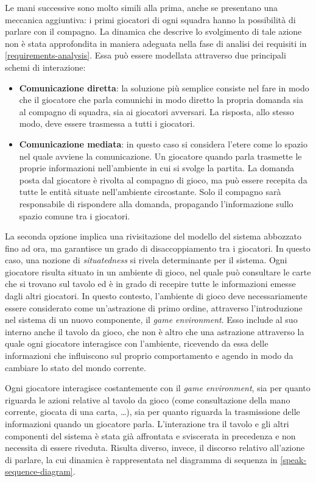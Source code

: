 \documentclass[a4paper,12pt]{article}
\begin{document}
Le mani successive sono molto simili alla prima, anche se presentano una meccanica aggiuntiva: i primi giocatori di ogni squadra hanno la possibilità di parlare con il compagno. La dinamica che descrive lo svolgimento di tale azione non è stata approfondita in maniera adeguata nella fase di analisi dei requisiti in \autoref{requirements-analysis}. Essa può essere modellata attraverso due principali schemi di interazione:
\begin{itemize}
	\item \textbf{Comunicazione diretta}: la soluzione più semplice consiste nel fare in modo che il giocatore che parla comunichi in modo diretto la propria domanda sia al compagno di squadra, sia ai giocatori avversari. La risposta, allo stesso modo, deve essere trasmessa a tutti i giocatori.
	\item \textbf{Comunicazione mediata}: in questo caso si considera l'etere come lo spazio nel quale avviene la comunicazione. Un giocatore quando parla trasmette le proprie informazioni nell'ambiente in cui si svolge la partita. La domanda posta dal giocatore è rivolta al compagno di gioco, ma può essere recepita da tutte le entità situate nell'ambiente circostante. Solo il compagno sarà responsabile di rispondere alla domanda, propagando l'informazione sullo spazio comune tra i giocatori.
\end{itemize}
La seconda opzione implica una rivisitazione del modello del sistema abbozzato fino ad ora, ma garantisce un grado di disaccoppiamento tra i giocatori. In questo caso, una nozione di \emph{situatedness} si rivela determinante per il sistema. Ogni giocatore risulta situato in un ambiente di gioco, nel quale può consultare le carte che si trovano sul tavolo ed è in grado di recepire tutte le informazioni emesse dagli altri giocatori. In questo contesto, l'ambiente di gioco deve necessariamente essere considerato come un'astrazione di primo ordine, attraverso l'introduzione nel sistema di un nuovo componente, il \emph{game environment}. Esso include al suo interno anche il tavolo da gioco, che non è altro che una astrazione attraverso la quale ogni giocatore interagisce con l'ambiente, ricevendo da essa delle informazioni che influiscono sul proprio comportamento e agendo in modo da cambiare lo stato del mondo corrente. 

Ogni giocatore interagisce costantemente con il \emph{game environment}, sia per quanto riguarda le azioni relative al tavolo da gioco (come consultazione della mano corrente, giocata di una carta, \dots), sia per quanto riguarda la trasmissione delle informazioni quando un giocatore parla. L'interazione tra il tavolo e gli altri componenti del sistema è stata già affrontata e sviscerata in precedenza e non necessita di essere riveduta. Risulta diverso, invece, il discorso relativo all'azione di parlare, la cui dinamica è rappresentata nel diagramma di sequenza in \autoref{speak-sequence-diagram}.
\end{document}
